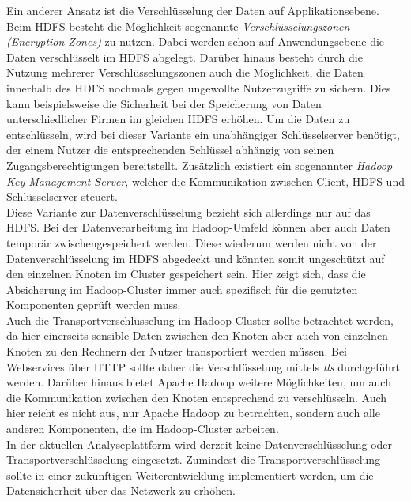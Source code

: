 \noindent
Ein anderer Ansatz ist die Verschlüsselung der Daten auf Applikationsebene. Beim HDFS besteht die Möglichkeit sogenannte \textit{Verschlüsselungszonen (Encryption Zones)} zu nutzen. Dabei werden schon auf Anwendungsebene die Daten verschlüsselt im HDFS abgelegt. Darüber hinaus besteht durch die Nutzung mehrerer Verschlüsselungszonen auch die Möglichkeit, die Daten innerhalb des HDFS nochmals gegen ungewollte Nutzerzugriffe zu sichern. Dies kann beispielsweise die Sicherheit bei der Speicherung von Daten unterschiedlicher Firmen im gleichen HDFS erhöhen. Um die Daten zu entschlüsseln, wird bei dieser Variante ein unabhängiger Schlüsselserver benötigt, der einem Nutzer die entsprechenden Schlüssel abhängig von seinen Zugangsberechtigungen bereitstellt. Zusätzlich existiert ein sogenannter \textit{Hadoop Key Management Server}, welcher die Kommunikation zwischen Client, HDFS und Schlüsselserver steuert.\cite[S. 192-200]{hadoop_security}\\
Diese Variante zur Datenverschlüsselung bezieht sich allerdings nur auf das HDFS. Bei der Datenverarbeitung im Hadoop-Umfeld können aber auch Daten temporär zwischengespeichert werden. Diese wiederum werden nicht von der Datenverschlüsselung im HDFS abgedeckt und könnten somit ungeschützt auf den einzelnen Knoten im Cluster gespeichert sein. Hier zeigt sich, dass die Absicherung im Hadoop-Cluster immer auch spezifisch für die genutzten Komponenten geprüft werden muss. \\

\noindent
Auch die Transportverschlüsselung im Hadoop-Cluster sollte betrachtet werden, da hier einerseits sensible Daten zwischen den Knoten aber auch von einzelnen Knoten zu den Rechnern der Nutzer transportiert werden müssen. Bei Webservices über HTTP sollte daher die Verschlüsselung mittels \textit{\gls{tls}} durchgeführt werden. Darüber hinaus bietet Apache Hadoop weitere Möglichkeiten, um auch die Kommunikation zwischen den Knoten entsprechend zu verschlüsseln. Auch hier reicht es nicht aus, nur Apache Hadoop zu betrachten, sondern auch alle anderen Komponenten, die im Hadoop-Cluster arbeiten. \cite[S. 207-216]{hadoop_security}\\

\noindent
In der aktuellen Analyseplattform wird derzeit keine Datenverschlüsselung oder Transportverschlüsselung eingesetzt. Zumindest die Transportverschlüsselung sollte in einer zukünftigen Weiterentwicklung implementiert werden, um die Datensicherheit über das Netzwerk zu erhöhen.

